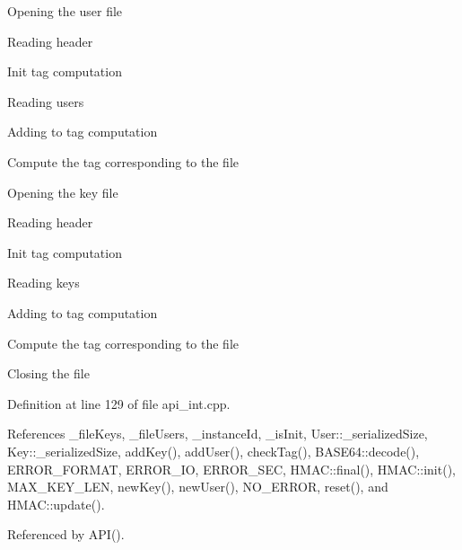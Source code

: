  
\begin{DoxyEnumerate}
\item Opening the user file


\item Reading header


\item Init tag computation 


\item Reading users


\item Adding to tag computation 


\item Compute the tag corresponding to the file 


\item Opening the key file


\item Reading header


\item Init tag computation 


\item Reading keys


\item Adding to tag computation 


\item Compute the tag corresponding to the file 


\item Closing the file


\end{DoxyEnumerate}

Definition at line 129 of file api\+\_\+int.\+cpp.



References \+\_\+file\+Keys, \+\_\+file\+Users, \+\_\+instance\+Id, \+\_\+is\+Init, User\+::\+\_\+serialized\+Size, Key\+::\+\_\+serialized\+Size, add\+Key(), add\+User(), check\+Tag(), B\+A\+S\+E64\+::decode(), E\+R\+R\+O\+R\+\_\+\+F\+O\+R\+M\+A\+T, E\+R\+R\+O\+R\+\_\+\+I\+O, E\+R\+R\+O\+R\+\_\+\+S\+E\+C, H\+M\+A\+C\+::final(), H\+M\+A\+C\+::init(), M\+A\+X\+\_\+\+K\+E\+Y\+\_\+\+L\+E\+N, new\+Key(), new\+User(), N\+O\+\_\+\+E\+R\+R\+O\+R, reset(), and H\+M\+A\+C\+::update().



Referenced by A\+P\+I().

\hypertarget{classAPI_a94ef4273680b86b5340442d965b48fab}{}
